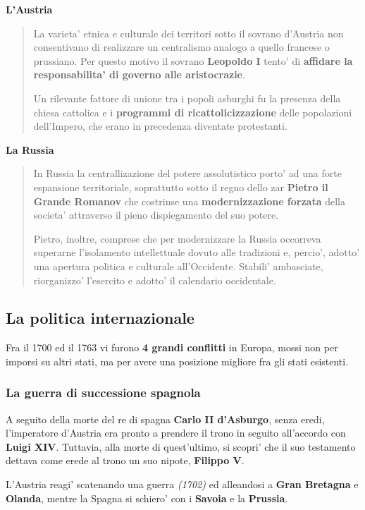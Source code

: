 \documentclass{article}
\begin{document}
{{    \textbf{L'Austria}
    \begin{quote}
      La varieta' etnica e culturale dei territori sotto il sovrano d'Austria non consentivano di realizzare un centralismo analogo a quello francese o prussiano. Per questo motivo il sovrano \textbf{Leopoldo I} tento' di \textbf{affidare la responsabilita' di governo alle aristocrazie}.

      Un rilevante fattore di unione tra i popoli asburghi fu la presenza della chiesa cattolica e i \textbf{programmi di ricattolicizzazione} delle popolazioni dell'Impero, che erano in precedenza diventate protestanti.
    \end{quote}

    \textbf{La Russia}
    \begin{quote}
      In Russia la centrallizazione del potere assolutistico porto' ad una forte espansione territoriale, soprattutto sotto il regno dello zar \textbf{Pietro il Grande Romanov} che costrinse una \textbf{modernizzazione forzata} della societa' attraverso il pieno dispiegamento del suo potere.

      Pietro, inoltre, comprese che per modernizzare la Russia occorreva superarne l'isolamento intellettuale dovuto alle tradizioni e, percio', adotto' una apertura politica e culturale all'Occidente. Stabili' ambasciate, riorganizzo' l'esercito e adotto' il calendario occidentale.
    \end{quote}

    \subsection{La politica internazionale}
    Fra il 1700 ed il 1763 vi furono \textbf{4 grandi conflitti} in Europa, mossi non per imporsi su altri stati, ma per avere una posizione migliore fra gli stati esistenti.

    \subsubsection{La guerra di successione spagnola}
    A seguito della morte del re di spagna \textbf{Carlo II d'Asburgo}, senza eredi, l'imperatore d'Austria era pronto a prendere il trono in seguito all'accordo con \textbf{Luigi XIV}. Tuttavia, alla morte di quest'ultimo, si scopri' che il suo testamento dettava come erede al trono un suo nipote, \textbf{Filippo V}.

    L'Austria reagi' scatenando una guerra \textit{(1702)} ed alleandosi a \textbf{Gran Bretagna} e \textbf{Olanda}, mentre la Spagna si schiero' con i \textbf{Savoia} e la \textbf{Prussia}.

}}
\end{document}

